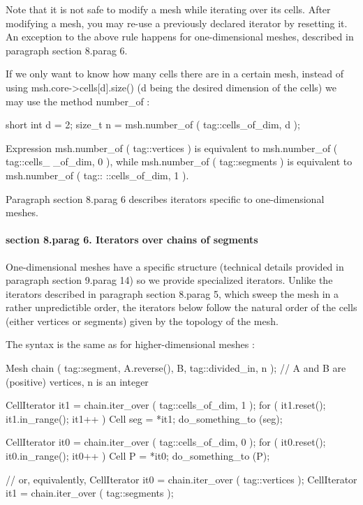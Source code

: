 Note that it is not safe to modify a mesh while iterating over its cells.
After modifying a mesh, you may re-use a previously declared iterator by {\codett reset}ting it.
An exception to the above rule happens for one-dimensional meshes, described in paragraph
\numb section 8.\numb parag 6.

If we only want to know how many cells there are in a certain mesh,
instead of using {\codett msh.core->cells[d].size()} ({\codett d} being the desired
dimension of the cells) we may use the method {\codett number\_of} :

\verbatim
   short int d = 2;
   size_t n = msh.number_of ( tag::cells_of_dim, d );
\endverbatim

\noindent Expression {\codett msh.number\_of ( tag::vertices )} is equivalent to
{\codett msh.number\_of ( tag::cells\_ \_of\_dim, 0 )}, while {\codett msh.number\_of
( tag::segments ) } is equivalent to {\codett msh.number\_of ( tag:: ::cells\_of\_dim, 1 )}.

Paragraph \numb section 8.\numb parag 6 describes iterators specific to one-dimensional
meshes.


\paragraph{\numb section 8.\numb parag 6. Iterators over chains of segments}

One-dimensional meshes have a specific structure (technical details provided in
paragraph \numb section 9.\numb parag 14) so we provide specialized iterators.
Unlike the iterators described in paragraph \numb section 8.\numb parag 5,
which sweep the mesh in a rather unpredictible order,
the iterators below follow the natural order of the cells (either vertices or segments)
given by the topology of the mesh.

The syntax is the same as for higher-dimensional meshes :

\verbatim
   Mesh chain ( tag::segment, A.reverse(), B, tag::divided_in, n );
   // A and B are (positive) vertices, n is an integer
   
   CellIterator it1 = chain.iter_over ( tag::cells_of_dim, 1 );
   for ( it1.reset(); it1.in_range(); it1++ )
   {  Cell seg = *it1;  do_something_to (seg);  }
   
   CellIterator it0 = chain.iter_over ( tag::cells_of_dim, 0 );
   for ( it0.reset(); it0.in_range(); it0++ )
   {  Cell P = *it0;  do_something_to (P);  }

   // or, equivalently,
   CellIterator it0 = chain.iter_over ( tag::vertices );
   CellIterator it1 = chain.iter_over ( tag::segments );
\endverbatim

